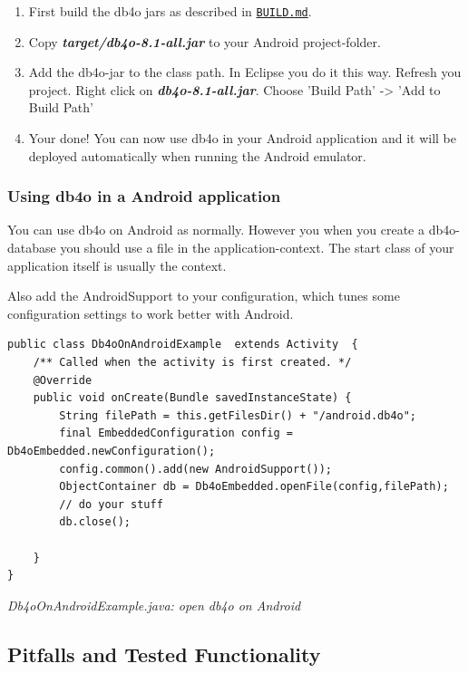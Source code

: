 \begin{enumerate}
\item First build the db4o jars as described in \href{https://github.com/blakemcbride/db4o/blob/master/BUILD.md}{\nolinkurl{BUILD.md}}.
\item Copy \textbf{\emph{target/db4o-8.1-all.jar}} to your Android project-folder.
\item Add the db4o-jar to the class path. In Eclipse you do it this way. Refresh you project. Right click on \textbf{\emph{db4o-8.1-all.jar}}. Choose 'Build Path' -\textgreater{} 'Add to Build Path'
\item Your done! You can now use db4o in your Android application and it will be deployed automatically when running the Android emulator.
\end{enumerate}

\subsubsection*{Using db4o in a Android application}

You can use db4o on Android as normally. However you when you create a db4o-database you should use a file in the application-context. The start class of your application itself is usually the context.

Also add the AndroidSupport to your configuration, which tunes some configuration settings to work better with Android.

\begin{lstlisting}
public class Db4oOnAndroidExample  extends Activity  {    
    /** Called when the activity is first created. */
    @Override
    public void onCreate(Bundle savedInstanceState) {
        String filePath = this.getFilesDir() + "/android.db4o";
        final EmbeddedConfiguration config = Db4oEmbedded.newConfiguration();
        config.common().add(new AndroidSupport());
        ObjectContainer db = Db4oEmbedded.openFile(config,filePath);
        // do your stuff
        db.close();
        
    }
}
\end{lstlisting}

{\small\itshape Db4oOnAndroidExample.java: open db4o on Android\par}
\medskip

\subsection{Pitfalls and Tested Functionality}
\label{ref:platform-specific-issues-android-state-and-pitfalls}

